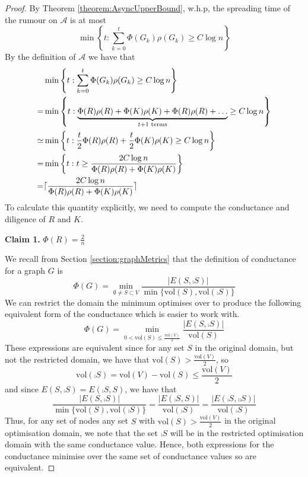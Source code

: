 \begin{proof}
By Theorem \ref{theorem:AsyncUpperBound}, w.h.p, the spreading time of the rumour on $\mathcal{A}$ is at most
$$
	\min \left\{t : \sum_{k=0}^t \Phi(G_k)\rho(G_k) \geq C \log n \right\} 
$$
By the definition of $\mathcal{A}$ we have that 
\begin{align*}
	&\min \left\{t : \sum_{k=0}^t \Phi(G_k)\rho(G_k) \geq C \log n \right\} \\
	= &\min \left\{t : \underbrace{\Phi(R)\rho(R) + \Phi(K)\rho(K) + \Phi(R)\rho(R) + \dots}_{t + 1 \text{ terms}} \geq C \log n \right\} \\
	\simeq &\min \left\{t : \frac{t}{2}\Phi(R)\rho(R) + \frac{t}{2}\Phi(K)\rho(K) \geq C \log n \right\} \\
	= &\min \left\{t : t \geq \frac{2C \log n}{\Phi(R)\rho(R) + \Phi(K)\rho(K)} \right\} \\
	= &\lceil\frac{2C \log n}{\Phi(R)\rho(R) + \Phi(K)\rho(K)}\rceil
\end{align*}
To calculate this quantity explicitly, we need to compute the conductance and diligence of $R$ and $K$. 

\textbf{Claim 1.} $\Phi(R)=\frac{2}{n}$

We recall from Section \ref{section:graphMetrics} that the definition of conductance for a graph $G$ is 
$$
	\Phi(G) 
	= \min_{\emptyset \neq S \subset V} \frac{|E(S, \comp{S})|}{\min\{\text{vol}(S), \text{vol}(\comp{S})\}} 
$$
We can restrict the domain the minimum optimises over to produce the following equivalent form of the conductance which is easier to work with.
$$
	\Phi(G) 
	= \min_{0 < \text{vol}(S) \leq \frac{\text{vol}(V)}{2}} \frac{|E(S, \comp{S})|}{\text{vol}(S)} 
$$
These expressions are equivalent since for any set $S$ in the original domain, but not the restricted domain, we have that $\text{vol}(S) > \frac{\text{vol}(V)}{2}$, so
$$
	\text{vol}(\comp{S}) 
	= \text{vol}(V) - \text{vol}(S) 
	\leq \frac{\text{vol}(V)}{2}
$$
and since $E(S, \comp{S}) = E(\comp{S}, S)$, we have that
$$
	\frac{|E(S, \comp{S})|}{\min\{\text{vol}(S), \text{vol}(\comp{S})\}} = \frac{|E(\comp{S}, S)|}{\text{vol}(\comp{S})} 
	= 
	\frac{|E(\comp{S}, \comp{\comp{S}})|}{\text{vol}(\comp{S})} 
$$
Thus, for any set of nodes any set $S$ with $\text{vol}(S) > \frac{\text{vol}(V)}{2}$ in the original optimisation domain, we note that the set $\comp{S}$ will be in the restricted optimisation  domain with the same conductance value. Hence, both expressions for the conductance minimise over the same set of conductance values so are equivalent.


\end{proof}
